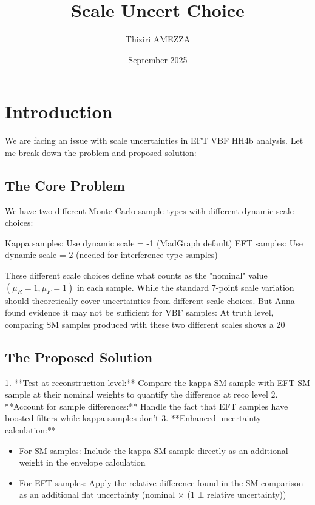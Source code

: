 \documentclass{article}
\title{Scale Uncert Choice}
\author{Thiziri AMEZZA}
\date{September 2025}
\begin{document}
\maketitle

\section{Introduction}

We are facing an issue with scale uncertainties in EFT VBF HH4b analysis. Let me break down the problem and proposed solution:

\subsection{\textbf{The Core Problem}}

We have two different Monte Carlo sample types with different dynamic scale choices:

Kappa samples: Use dynamic scale = -1 (MadGraph default)
EFT samples: Use dynamic scale = 2 (needed for interference-type samples)


These different scale choices define what counts as the "nominal" value $(\mu_R = 1, \mu_F=1)$ in each sample. While the standard 7-point scale variation should theoretically cover uncertainties from different scale choices. But Anna found evidence it may not be sufficient for VBF samples: At truth level, comparing SM samples produced with these two different scales shows a 20%


\subsection{\textbf{The Proposed Solution}}

1.  **Test at reconstruction level:** Compare the kappa SM sample with EFT SM sample at their nominal weights to quantify the difference at reco level
2. **Account for sample differences:** Handle the fact that EFT samples have boosted filters while kappa samples don't
3.  **Enhanced uncertainty calculation:**

\begin{itemize}
    \item For SM samples: Include the kappa SM sample directly as an additional weight in the envelope calculation
    \item For EFT samples: Apply the relative difference found in the SM comparison as an additional flat uncertainty (nominal × (1 ± relative uncertainty))
\end{itemize}
\end{document}
